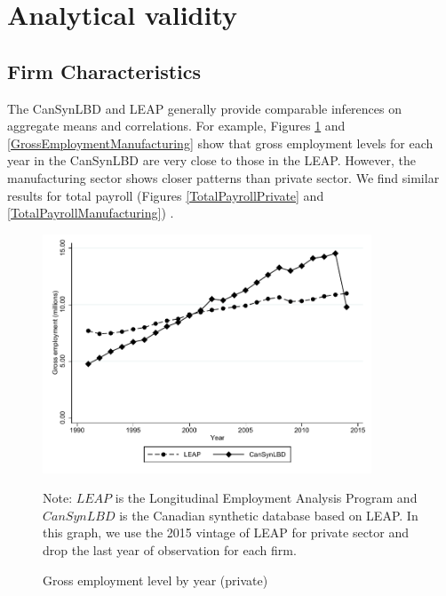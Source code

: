 \documentclass{article}
\begin{document}

\section{Analytical validity}

\subsection{Firm Characteristics}

The CanSynLBD and LEAP generally provide comparable inferences on aggregate means and correlations. For example, Figures \ref{GrossEmploymentPrivate} and \ref{GrossEmploymentManufacturing} show that gross employment levels for each year in the CanSynLBD are very close to those in the LEAP. However, the manufacturing sector shows closer patterns than private sector. We find similar results for total payroll (Figures \ref{TotalPayrollPrivate} and  \ref{TotalPayrollManufacturing}) .

\begin{figure} [H]
\centering
\caption{Gross employment level by year (private)} \label{GrossEmploymentPrivate}
\includegraphics[height=2.8in, width=.7\linewidth]{graphs/Gross_employment_level_by_year_private_bw.pdf} 
\begin{minipage}{0.85\textwidth}
{\footnotesize Note: $LEAP$ is the Longitudinal Employment Analysis Program and $CanSynLBD$ is the Canadian synthetic database based on LEAP. In this graph, we use the 2015 vintage of LEAP for private sector and drop the last year of observation for each firm. \par}
\end{minipage}
\end{figure}
\end{document}
